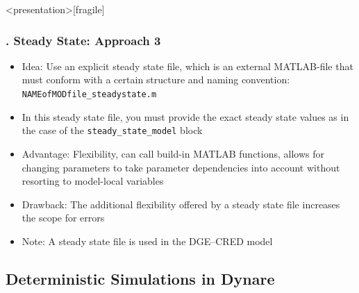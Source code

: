 \documentclass[11pt,aspectratio=169]{beamer}
\begin{document}
\begin{frame}<presentation>[fragile]
	\frametitle{{\thesection.\thesubsection} Steady State: Approach 3}
	\begin{itemize}
		\item Idea: Use an explicit steady state file, which is an external MATLAB-file that must conform with a certain structure and naming convention:\\ \texttt{NAMEofMODfile\_steadystate.m}
		\item In this steady state file, you must provide the exact steady state values as in the case of the \texttt{steady\_state\_model} block
		\item Advantage: Flexibility, can call build-in MATLAB functions, allows for changing parameters to take parameter dependencies into account without resorting to model-local variables
		\item Drawback: The additional flexibility offered by a steady state file increases the scope for errors
		\item Note: A steady state file is used in the DGE--CRED model
	\end{itemize}
\end{frame}
\subsection{Deterministic Simulations in Dynare}
\end{document}
